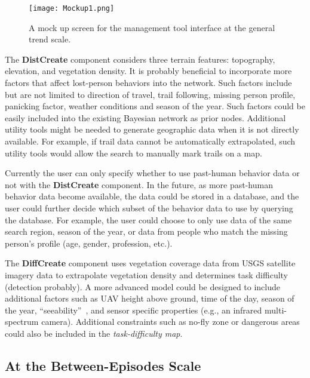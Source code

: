 \begin{figure}
\centering
\texttt{[image: Mockup1.png]}
\caption{A mock up screen for the management tool interface at the general trend scale.}
\label{Mockup1}
\end{figure}

The \textbf{DistCreate} component considers three terrain features: topography, elevation, and vegetation density. It is probably beneficial to incorporate more factors that affect lost-person behaviors into the network. Such factors include but are not limited to direction of travel, trail following, missing person profile, panicking factor, weather conditions and season of the year. Such factors could be easily included into the existing Bayesian network as prior nodes. Additional utility tools might be needed to generate geographic data when it is not directly available. For example, if trail data cannot be automatically extrapolated, such utility tools would allow the search to manually mark trails on a map.

Currently the user can only specify whether to use past-human behavior data or not with the \textbf{DistCreate} component. In the future, as more past-human behavior data become available, the data could be stored in a database, and the user could further decide which subset of the behavior data to use by querying the database. For example, the user could choose to only use data of the same search region, season of the year, or data from people who match the missing person's profile (age, gender, profession, etc.).

The \textbf{DiffCreate} component uses vegetation coverage data from USGS satellite imagery data to extrapolate vegetation density and determines task difficulty (detection probably). A more advanced model could be designed to include additional factors such as UAV height above ground, time of the day, season of the year, ``seeability''~\cite{Morse2010UAV}, and sensor specific properties (e.g., an infrared multi-spectrum camera). Additional constraints such as no-fly zone or dangerous areas could also be included in the \textit{task-difficulty map}.

\subsection{At the Between-Episodes Scale}

